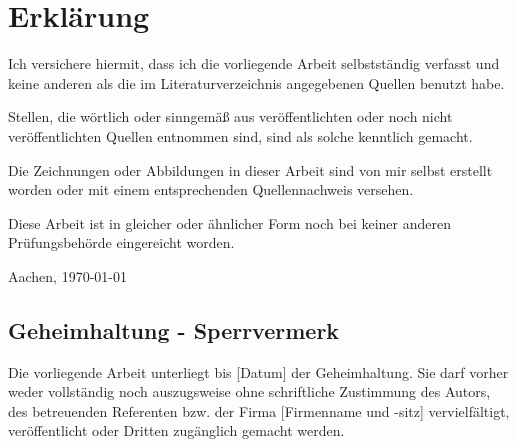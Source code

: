 \clearpage
\chapter*{Erklärung}\label{erklaerung}
Ich versichere hiermit, dass ich die vorliegende Arbeit selbstständig verfasst und keine anderen als die im Literaturverzeichnis angegebenen Quellen benutzt habe.

\bigskip

Stellen, die wörtlich oder sinngemäß aus veröffentlichten oder noch nicht veröffentlichten Quellen entnommen sind, sind als solche kenntlich gemacht.

\bigskip

Die Zeichnungen oder Abbildungen in dieser Arbeit sind von mir selbst erstellt worden oder mit einem entsprechenden Quellennachweis versehen.

\bigskip

Diese Arbeit ist in gleicher oder ähnlicher Form noch bei keiner anderen Prüfungsbehörde eingereicht worden.

\vspace{1cm}
Aachen, \today %

\vspace{7cm}
\section*{Geheimhaltung - Sperrvermerk}\label{geheimhaltung}

Die vorliegende Arbeit unterliegt bis [Datum] der Geheimhaltung. Sie darf vorher weder vollständig noch auszugsweise ohne schriftliche Zustimmung des Autors, des betreuenden Referenten bzw. der Firma [Firmenname und -sitz] vervielfältigt, veröffentlicht oder Dritten zugänglich gemacht werden.